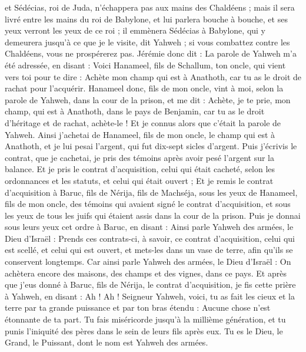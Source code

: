 \begin{multicols}{2}
et Sédécias, roi de Juda, n'échappera pas aux mains des Chaldéens ; mais il sera livré entre les mains du roi de Babylone, et lui parlera bouche à bouche, et ses yeux verront les yeux de ce roi ;
il emmènera Sédécias à Babylone, qui y demeurera jusqu'à ce que je le visite, dit Yahweh ; si vous combattez contre les Chaldéens, vous ne prospérerez pas.
Jérémie donc dit : La parole de Yahweh m'a été adressée, en disant :
Voici Hanameel, fils de Schallum, ton oncle, qui vient vers toi pour te dire : Achète mon champ qui est à Anathoth, car tu as le droit de rachat pour l'acquérir.
Hanameel donc, fils de mon oncle, vint à moi, selon la parole de Yahweh, dans la cour de la prison, et me dit : Achète, je te prie, mon champ, qui est à Anathoth, dans le pays de Benjamin, car tu as le droit d'héritage et de rachat, achète-le ! Et je connus alors que c'était la parole de Yahweh.
Ainsi j'achetai de Hanameel, fils de mon oncle, le champ qui est à Anathoth, et je lui pesai l'argent, qui fut dix-sept sicles d'argent.
Puis j'écrivis le contrat, que je cachetai, je pris des témoins après avoir pesé l'argent sur la balance.
Et je pris le contrat d'acquisition, celui qui était cacheté, selon les ordonnances et les statuts, et celui qui était ouvert ;
Et je remis le contrat d'acquisition à Baruc, fils de Nérija, fils de Machséja, sous les yeux de Hanameel, fils de mon oncle, des témoins qui avaient signé le contrat d'acquisition, et sous les yeux de tous les juifs qui étaient assis dans la cour de la prison.
Puis je donnai sous leurs yeux cet ordre à Baruc, en disant :
Ainsi parle Yahweh des armées, le Dieu d'Israël : Prends ces contrats-ci, à savoir, ce contrat d'acquisition, celui qui est scellé, et celui qui est ouvert, et mets-les dans un vase de terre, afin qu'ils se conservent longtemps.
Car ainsi parle Yahweh des armées, le Dieu d'Israël : On achètera encore des maisons, des champs et des vignes, dans ce pays.
Et après que j'eus donné à Baruc, fils de Nérija, le contrat d'acquisition, je fis cette prière à Yahweh, en disant :
Ah ! Ah ! Seigneur Yahweh, voici, tu as fait les cieux et la terre par ta grande puissance et par ton bras étendu : Aucune chose n'est étonnante de ta part.
Tu fais miséricorde jusqu'à la millième génération, et tu punis l'iniquité des pères dans le sein de leurs fils après eux. Tu es le Dieu, le Grand, le Puissant, dont le nom est Yahweh des armées.

\end{multicols}
